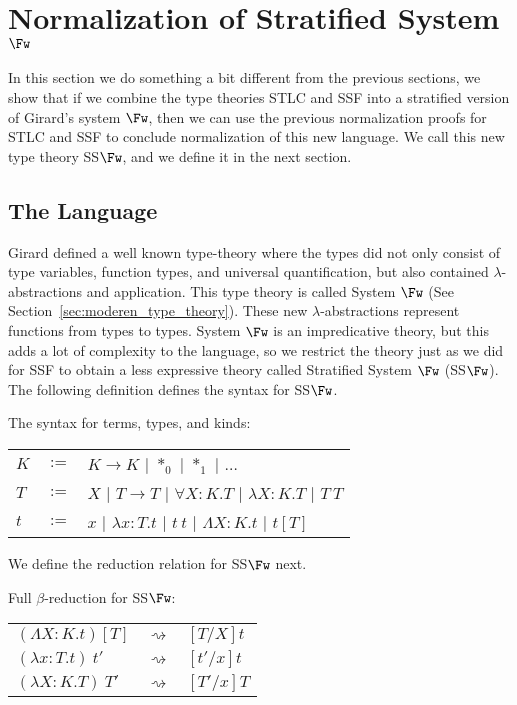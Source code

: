 \section{Normalization of Stratified System $\Fw$}
\label{subsec:normalization_stratified_system_fw}
In this section we do something a bit different from the previous
sections, we show that if we combine the type theories STLC and SSF
into a stratified version of Girard's system $\Fw$, then we can use
the previous normalization proofs for STLC and SSF to conclude
normalization of this new language.  We call this new type theory
SS$\Fw$, and we define it in the next section.

\subsection{The Language}
\label{subsec:the_language}
Girard defined a well known type-theory where the types did not only
consist of type variables, function types, and universal
quantification, but also contained $\lambda$-abstractions and
application.  This type theory is called System $\Fw$
\cite{barendregt92} (See Section~\ref{sec:moderen_type_theory}). These
new $\lambda$-abstractions represent functions from types to types.
System $\Fw$ is an impredicative theory, but this adds a lot of
complexity to the language, so we restrict the theory just as we did
for SSF to obtain a less expressive theory called Stratified System
$\Fw$ (SS$\Fw$). The following definition defines the syntax for
SS$\Fw$.
\begin{definition}
  \label{def:syntax_ssfw}
  The syntax for terms, types, and kinds:
  \begin{center}
    \begin{tabular}{lll}
      $K$ & $:=$ & $K \to K$ $|$ $*_0$ $|$ $*_1$ $|$ $\ldots$\\
      $T$ & $:=$ & $X$   $|$ $T \rightarrow T$ $|$ $\forall X:K.T$ $|$ $\lambda X:K.T$ $|$ $T\ T$\\
      $t$ & $:=$ & $x$   $|$ $\lambda x:T.t$   $|$ $t\ t$ $|$ $\Lambda X:K.t$ $|$ $t[T]$\\
    \end{tabular}
  \end{center}
\end{definition}
\noindent We define the reduction relation for SS$\Fw$ next.
\begin{definition}
  \label{def:reduction_rules_ssf}
  Full $\beta$-reduction for SS$\Fw$:
  \begin{center}
    \begin{tabular}{lll}
      $(\Lambda X:K.t)[T]$     & $\rightsquigarrow$ & $[T/X]t$\\
      $(\lambda x:T.t)\ t'$      & $\rightsquigarrow$ & $[t'/x]t$\\
      $(\lambda X:K.T)\ T'$ & $\rightsquigarrow$ & $[T'/x]T$
    \end{tabular}
  \end{center}
\end{definition}

